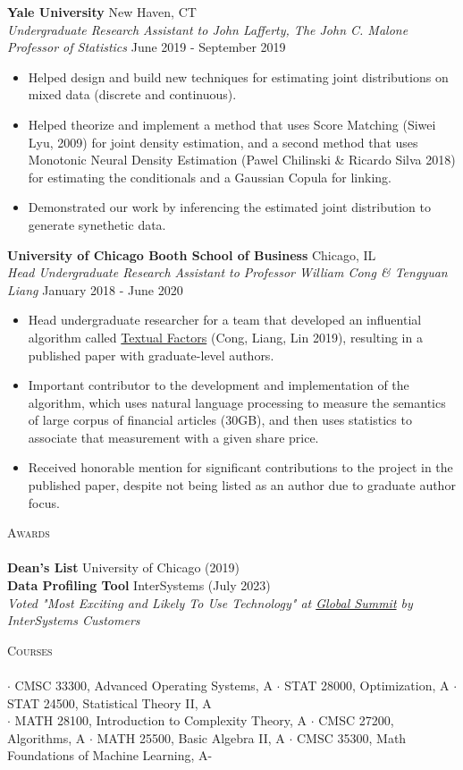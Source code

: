 \documentclass[a4paper]{article}
\newcommand{\lineunder} {
    \vspace*{-8pt} \\
    \hspace*{-18pt} \hrulefill \\
}
\newcommand{\header} [1] {
    {\hspace*{-18pt}\vspace*{6pt} \textsc{#1}}
    \vspace*{-6pt} \lineunder
}
\begin{document}
\textbf{Yale University} \hfill New Haven, CT\\
\textit{Undergraduate Research Assistant to John Lafferty, The John C. Malone Professor of Statistics} \hfill June 2019 - September 2019\\
\vspace{-1mm}
\begin{itemize} \itemsep 1pt
	\item Helped design and build new techniques for estimating joint distributions on mixed data (discrete and continuous).
	\item Helped theorize and implement a method that uses Score Matching (Siwei Lyu, 2009) for joint density estimation, and a second method that uses Monotonic Neural Density Estimation
	      (Pawel Chilinski \& Ricardo Silva 2018) for estimating the conditionals and a Gaussian Copula for linking.
	\item Demonstrated our work by inferencing the estimated joint distribution to generate synethetic data.
\end{itemize}
\textbf{University of Chicago Booth School of Business} \hfill Chicago, IL\\
\textit{Head Undergraduate Research Assistant to Professor William Cong \& Tengyuan Liang} \hfill January 2018 - June 2020\\
\vspace{-1mm}
\begin{itemize} \itemsep 1pt
	\item Head undergraduate researcher for a team that developed an influential algorithm called \href{https://papers.ssrn.com/sol3/papers.cfm?abstract_id=3307057}{Textual Factors} (Cong, Liang, Lin 2019), resulting in a published paper with graduate-level authors.
	\item Important contributor to the development and implementation of the algorithm, which uses natural language processing to measure the semantics of large corpus of financial articles (30GB), and then uses statistics to associate that measurement with a given share price.
	\item Received honorable mention for significant contributions to the project in the published paper, despite not being listed as an author due to graduate author focus.
\end{itemize}

\header{Awards}
\textbf{Dean’s List} \hfill University of Chicago (2019)\\
\textbf{Data Profiling Tool} \hfill InterSystems (July 2023) \\
\textit{Voted "Most Exciting and Likely To Use Technology" at \href{https://www.intersystems.com/global-summit}{Global Summit} by InterSystems Customers}


\header{Courses}
$\cdot$ CMSC 33300, Advanced Operating Systems, A
$\cdot$ STAT 28000, Optimization, A
$\cdot$ STAT 24500, Statistical Theory II, A \\
$\cdot$ MATH 28100, Introduction to Complexity Theory, A
$\cdot$ CMSC 27200, Algorithms, A
$\cdot$ MATH 25500, Basic Algebra II, A
$\cdot$ CMSC 35300, Math Foundations of Machine Learning, A-
\end{document}
